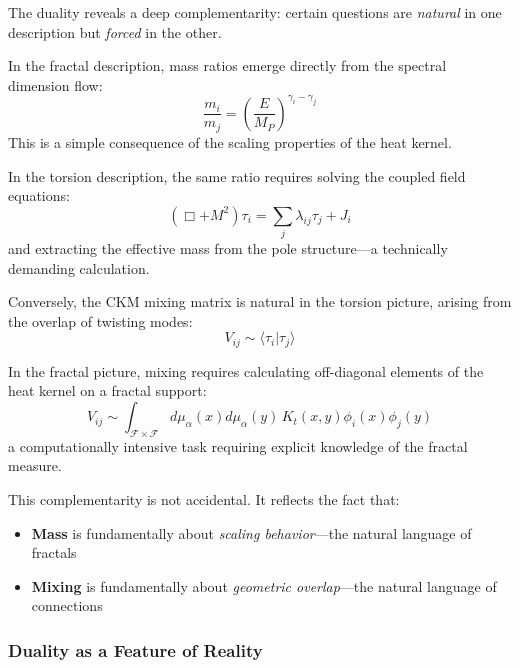 The duality reveals a deep complementarity: certain questions are \textit{natural} in one description but \textit{forced} in the other.

\begin{example}
In the fractal description, mass ratios emerge directly from the spectral dimension flow:
\begin{equation}
    \frac{m_i}{m_j} = \left(\frac{E}{M_P}\right)^{\gamma_i - \gamma_j}
\end{equation}
This is a simple consequence of the scaling properties of the heat kernel.

In the torsion description, the same ratio requires solving the coupled field equations:
\begin{equation}
    (\Box + M^2) \tau_i = \sum_j \lambda_{ij} \tau_j + J_i
\end{equation}
and extracting the effective mass from the pole structure—a technically demanding calculation.
\end{example}

\begin{example}
Conversely, the CKM mixing matrix is natural in the torsion picture, arising from the overlap of twisting modes:
\begin{equation}
    V_{ij} \sim \langle \tau_i | \tau_j \rangle
\end{equation}

In the fractal picture, mixing requires calculating off-diagonal elements of the heat kernel on a fractal support:
\begin{equation}
    V_{ij} \sim \int_{\mathcal{F} \times \mathcal{F}} d\mu_\alpha(x) d\mu_\alpha(y) \, K_t(x,y) \phi_i(x) \phi_j(y)
\end{equation}
a computationally intensive task requiring explicit knowledge of the fractal measure.
\end{example}

This complementarity is not accidental. It reflects the fact that:
\begin{itemize}
    \item \textbf{Mass} is fundamentally about \textit{scaling behavior}—the natural language of fractals
    \item \textbf{Mixing} is fundamentally about \textit{geometric overlap}—the natural language of connections
\end{itemize}

\subsubsection{Duality as a Feature of Reality}

